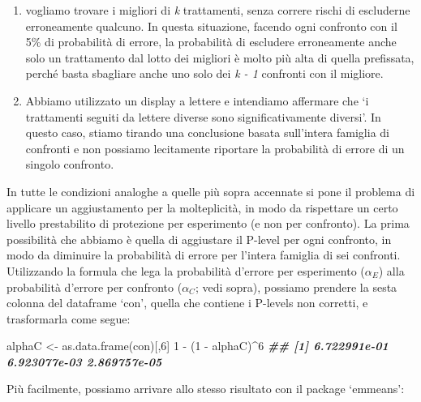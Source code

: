 \documentclass[
  12pt,
]{book}
\newenvironment{Shaded}{\begin{snugshade}}{\end{snugshade}}
\newcommand{\DecValTok}[1]{\textcolor[rgb]{0.00,0.00,0.81}{#1}}
\newcommand{\DocumentationTok}[1]{\textcolor[rgb]{0.56,0.35,0.01}{\textbf{\textit{#1}}}}
\newcommand{\FunctionTok}[1]{\textcolor[rgb]{0.00,0.00,0.00}{#1}}
\newcommand{\NormalTok}[1]{#1}
\newcommand{\OtherTok}[1]{\textcolor[rgb]{0.56,0.35,0.01}{#1}}
\newcommand{\SpecialCharTok}[1]{\textcolor[rgb]{0.00,0.00,0.00}{#1}}
\providecommand{\tightlist}{%
  \setlength{\itemsep}{0pt}\setlength{\parskip}{0pt}}
\begin{document}
\begin{enumerate}
\def\labelenumi{\arabic{enumi}.}
\tightlist
\item
  vogliamo trovare i migliori di \emph{k} trattamenti, senza correre rischi di escluderne erroneamente qualcuno. In questa situazione, facendo ogni confronto con il 5\% di probabilità di errore, la probabilità di escludere erroneamente anche solo un trattamento dal lotto dei migliori è molto più alta di quella prefissata, perché basta sbagliare anche uno solo dei \emph{k - 1} confronti con il migliore.
\item
  Abbiamo utilizzato un display a lettere e intendiamo affermare che `i trattamenti seguiti da lettere diverse sono significativamente diversi'. In questo caso, stiamo tirando una conclusione basata sull'intera famiglia di confronti e non possiamo lecitamente riportare la probabilità di errore di un singolo confronto.
\end{enumerate}

In tutte le condizioni analoghe a quelle più sopra accennate si pone il problema di applicare un aggiustamento per la molteplicità, in modo da rispettare un certo livello prestabilito di protezione per esperimento (e non per confronto). La prima possibilità che abbiamo è quella di aggiustare il P-level per ogni confronto, in modo da diminuire la probabilità di errore per l'intera famiglia di sei confronti. Utilizzando la formula che lega la probabilità d'errore per esperimento (\(\alpha_E\)) alla probabilità d'errore per confronto (\(\alpha_C\); vedi sopra), possiamo prendere la sesta colonna del dataframe `con', quella che contiene i P-levels non corretti, e trasformarla come segue:

\scriptsize

\begin{Shaded}
\begin{Highlighting}[]
\NormalTok{alphaC }\OtherTok{\textless{}{-}} \FunctionTok{as.data.frame}\NormalTok{(con)[,}\DecValTok{6}\NormalTok{]}
\DecValTok{1} \SpecialCharTok{{-}}\NormalTok{ (}\DecValTok{1} \SpecialCharTok{{-}}\NormalTok{ alphaC)}\SpecialCharTok{\^{}}\DecValTok{6}
\DocumentationTok{\#\# [1] 6.722991e{-}01 6.923077e{-}03 2.869757e{-}05}
\end{Highlighting}
\end{Shaded}

\normalsize

Più facilmente, possiamo arrivare allo stesso risultato con il package `emmeans':

\scriptsize
\end{document}
